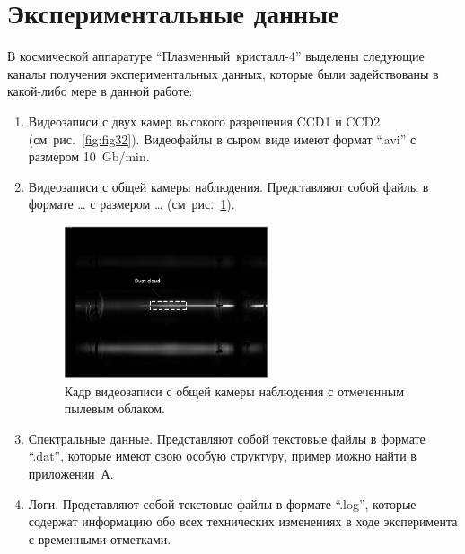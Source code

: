 \section{Экспериментальные данные}
\label{cha:ch_3_4}
В космической аппаратуре “Плазменный~кристалл-4” выделены следующие каналы получения экспериментальных данных,
которые были задействованы в какой-либо мере в данной работе:
\begin{enumerate}
    \item Видеозаписи с двух камер высокого разрешения CCD1 и CCD2 (см~рис.~\ref{fig:fig32}).
    Видеофайлы в сыром виде имеют формат “.avi” с размером 10~Gb/min.

    \item Видеозаписи с общей камеры наблюдения. Представляют собой файлы в формате … с размером … (см~рис.~\ref{fig:fig33}).
    \begin{figure}[t]
      \centering
      \includegraphics[width=6cm]{figures/fig33}
      \caption{Кадр видеозаписи с общей камеры наблюдения с отмеченным пылевым облаком.}
      \label{fig:fig33}
    \end{figure}

    \item Спектральные данные. Представляют собой текстовые файлы в формате “.dat”,
    которые имеют свою особую структуру, пример можно найти в \hyperref[app:app1]{приложении~А}.


    \item Логи. Представляют собой текстовые файлы в формате “.log”, которые содержат информацию обо всех
    технических изменениях в ходе эксперимента с временными отметками.


\end{enumerate}
